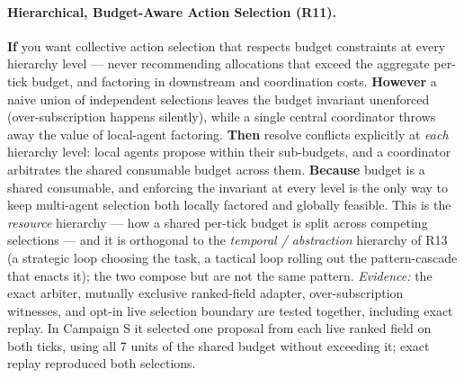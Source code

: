 \paragraph{Hierarchical, Budget-Aware Action Selection (R11).\apparatusmark{}} \textbf{If} you want collective action selection that respects budget constraints at every hierarchy level --- never recommending allocations that exceed the aggregate per-tick budget, and factoring in downstream and coordination costs. \textbf{However} a naive union of independent selections leaves the budget invariant unenforced (over-subscription happens silently), while a single central coordinator throws away the value of local-agent factoring. \textbf{Then} resolve conflicts explicitly at \emph{each} hierarchy level: local agents propose within their sub-budgets, and a coordinator arbitrates the shared consumable budget across them. \textbf{Because} budget is a shared consumable, and enforcing the invariant at every level is the only way to keep multi-agent selection both locally factored and globally feasible. This is the \emph{resource} hierarchy --- how a shared per-tick budget is split across competing selections --- and it is orthogonal to the \emph{temporal / abstraction} hierarchy of R13 (a strategic loop choosing the task, a tactical loop rolling out the pattern-cascade that enacts it); the two compose but are not the same pattern.  \emph{Evidence:} the exact arbiter, mutually exclusive ranked-field adapter, over-subscription witnesses, and opt-in live selection boundary are tested together, including exact replay.  In Campaign S it selected one proposal from each live ranked field on both ticks, using all 7 units of the shared budget without exceeding it; exact replay reproduced both selections.

